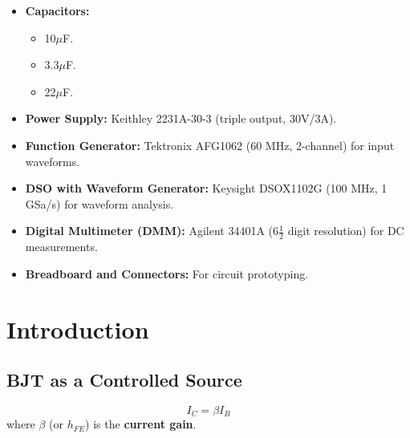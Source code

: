 \documentclass[conference]{IEEEtran}
\begin{document}
\begin{itemize}
    \item \textbf{Capacitors:} 
    \begin{itemize}
        \item 10$\mu$F.
        \item 3.3$\mu$F.
        \item 22$\mu$F.
    \end{itemize}

    \item \textbf{Power Supply:} Keithley 2231A-30-3 (triple output, 30V/3A).

    \item \textbf{Function Generator:} Tektronix AFG1062 (60 MHz, 2-channel) for input waveforms.

    \item \textbf{DSO with Waveform Generator:} Keysight DSOX1102G (100 MHz, 1 GSa/s) for waveform analysis.

    \item \textbf{Digital Multimeter (DMM):} Agilent 34401A (6$\frac{1}{2}$ digit resolution) for DC measurements.

    \item \textbf{Breadboard and Connectors:} For circuit prototyping.
\end{itemize}



\section{Introduction}

\subsection{BJT as a Controlled Source}
\begin{equation}
I_C = \beta I_B
\end{equation}
where $\beta$ (or $h_{FE}$) is the \textbf{current gain}.
\end{document}
